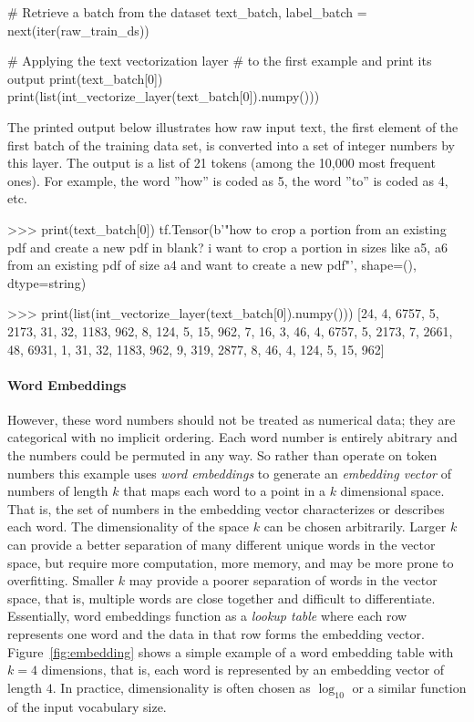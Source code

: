 \begin{pythoncode}
# Retrieve a batch from the dataset
text_batch, label_batch = next(iter(raw_train_ds))

# Applying the text vectorization layer
# to the first example and print its output
print(text_batch[0])
print(list(int_vectorize_layer(text_batch[0]).numpy()))
\end{pythoncode}

The printed output below illustrates how raw input text, the first element of the first batch of the training data set, is converted into a set of integer numbers by this layer. The output is a list of 21 tokens (among the 10,000 most frequent ones). For example, the word ''how'' is coded as 5, the word ''to'' is coded as 4, etc.

\begin{textcode}
>>> print(text_batch[0])
tf.Tensor(b'"how to crop a portion from an existing pdf and create 
a new pdf in blank? i want to crop a portion in sizes like a5, a6 
from an existing pdf of size a4 and want to create a new pdf"\n', 
shape=(), dtype=string)

>>> print(list(int_vectorize_layer(text_batch[0]).numpy()))
[24, 4, 6757, 5, 2173, 31, 32, 1183, 962, 8, 124, 5, 15, 962, 7, 16, 
3, 46, 4, 6757, 5, 2173, 7, 2661, 48, 6931, 1, 31, 32, 1183, 962, 9, 
319, 2877, 8, 46, 4, 124, 5, 15, 962]
\end{textcode}

\paragraph*{Word Embeddings}

However, these word numbers should not be treated as numerical data; they are categorical with no implicit ordering. Each word number is entirely abitrary and the numbers could be permuted in any way. So rather than operate on token numbers this example uses \emph{word embeddings} to generate an \emph{embedding vector} of numbers of length $k$ that maps each word to a point in a $k$ dimensional space. That is, the set of numbers in the embedding vector characterizes or describes each word. The dimensionality of the space $k$ can be chosen arbitrarily. Larger $k$ can provide a better separation of many different unique words in the vector space, but require more computation, more memory, and may be more prone to overfitting. Smaller $k$ may provide a poorer separation of words in the vector space, that is, multiple words are close together and difficult to differentiate. Essentially, word embeddings function as a \emph{lookup table} where each row represents one word and the data in that row forms the embedding vector. Figure~\ref{fig:embedding} shows a simple example of a word embedding table with $k=4$ dimensions, that is, each word is represented by an embedding vector of length $4$. In practice, dimensionality is often chosen as $\operatorname{log}_{10}$ or a similar function of the input vocabulary size. 

